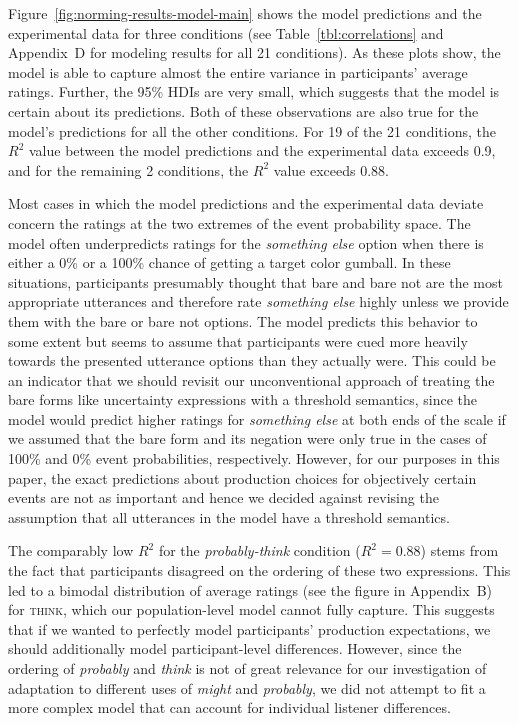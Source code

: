 \documentclass[man, floatsintext]{apa6}
\begin{document}
Figure~\ref{fig:norming-results-model-main} shows the model predictions and the experimental data for three conditions 
(see Table~\ref{tbl:correlations} and Appendix~D for modeling results for all 21 conditions). As these plots show, the model
is able to capture almost the entire variance in participants' average ratings. Further, the 95\% HDIs are very small, which suggests
that the model is certain about its predictions. Both of these observations are also true for the model's predictions for all the other
conditions. For 19 of the 21 conditions, the $R^2$ value between the model predictions and the experimental data exceeds 0.9,
and for the remaining 2 conditions, the $R^2$ value exceeds 0.88. 

Most cases in which the model predictions and the experimental data deviate concern the ratings at the two extremes of the event probability space.
The model often underpredicts ratings for the \textit{something else} option when there is either a 0\% or a 100\% chance of 
getting a target color gumball. In these situations, participants presumably thought that {\sc bare} and {\sc bare not} are the most appropriate
utterances and therefore rate \textit{something else} highly unless we provide them with the {\sc bare} or {\sc bare not} options. The model predicts
this behavior to some extent but seems to assume that participants were cued more heavily towards the presented utterance options than they actually were.
This could be an indicator that we should revisit our unconventional approach of treating the bare forms like uncertainty expressions with a threshold semantics,
since the model would predict higher ratings for \textit{something else} at both ends of the scale if we assumed that the bare form and its negation were only true
in the cases of 100\% and 0\% event probabilities, respectively. 
However, for our purposes in this paper, the exact predictions about production choices for objectively certain events are not as important and hence
we decided against revising the assumption that all utterances in the model have a threshold semantics.

The comparably low $R^2$ for the \textit{probably-think} condition ($R^2=0.88$) stems
from the fact that participants disagreed on the ordering of these two expressions. This  
led to a bimodal distribution of average ratings (see the figure in Appendix~B) for \textsc{think}, which our population-level 
model cannot fully capture. This suggests that if we wanted to perfectly model participants' production expectations, we should
additionally model participant-level differences. However, since the ordering of \textit{probably} and \textit{think} is not of great relevance
for our investigation of adaptation to different uses of \textit{might} and \textit{probably}, we did not attempt to fit a more complex model
that can account for individual listener differences. 
\end{document}
